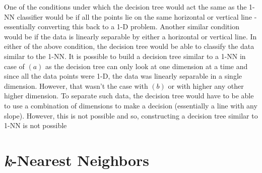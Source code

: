 \documentclass[11pt,addpoints,answers]{exam}
\begin{document}
\begin{questions}
\begin{parts}
    \begin{your_solution}[title=Your answer:,height=7cm,width=15cm]
    One of the conditions under which the decision tree would act the same as the 1-NN classifier would be if all the points lie on the same horizontal or vertical line - essentially converting this back to a 1-D problem. Another similar condition would be if the data is linearly separable by either a horizontal or vertical line. In either of the above condition, the decision tree would be able to classify the data similar to the 1-NN.\newline
It is possible to build a decision tree similar to a 1-NN in case of $(a)$ as the decision tree can only look at one dimension at a time and since all the data points were 1-D, the data was linearly separable in a single dimension. However, that wasn't the case with $(b)$ or with higher any other higher dimension. To separate such data, the decision tree would have to be able to use a combination of dimensions to make a decision (essentially a line with any slope). However, this is not possible and so, constructing a decision tree similar to 1-NN is not possible
    \end{your_solution}
    
    
    \end{parts}
    
\newpage

\end{questions}



\newpage
\section{{\it k}-Nearest Neighbors}
\end{document}
